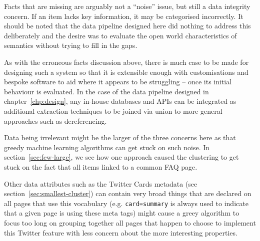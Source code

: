 Facts that are missing are arguably not a ``noise'' issue, but still
a data integrity concern. If an item lacks key information, it may
be categorised incorrectly. It should be noted that the data pipeline
designed here did nothing to address this deliberately and the desire
was to evaluate the open world characteristics of semantics without
trying to fill in the gaps.

As with the erroneous facts discussion above, there is much case to
be made for designing such a system so that it is extensible enough
with customisations and bespoke software to aid where it appears to be
struggling -- once its initial behaviour is evaluated. In the case
of the data pipeline designed in chapter~\ref{chp:design}, any
in-house databases and APIs can be integrated as additional extraction
techniques to be joined via union to more general approaches such
as dereferencing.

Data being irrelevant might be the larger of the three concerns here
as that greedy machine learning algorithms can get stuck on such
noise. In section~\ref{sec:few-large}, we see how one approach
caused the clustering to get stuck on the fact that all items linked
to a common FAQ page.

Other data attributes such as the Twitter
Cards metadata (see section~\ref{sec:smallest-cluster}) can contain
very broad things that are declared on all pages that use this
vocabulary (e.g. \texttt{card=summary} is always used to indicate that
a given page is using these meta tags) might cause a greey algorithm
to focus too long on grouping together all pages that happen to choose
to implement this Twitter feature with less concern about the more
interesting properties.

